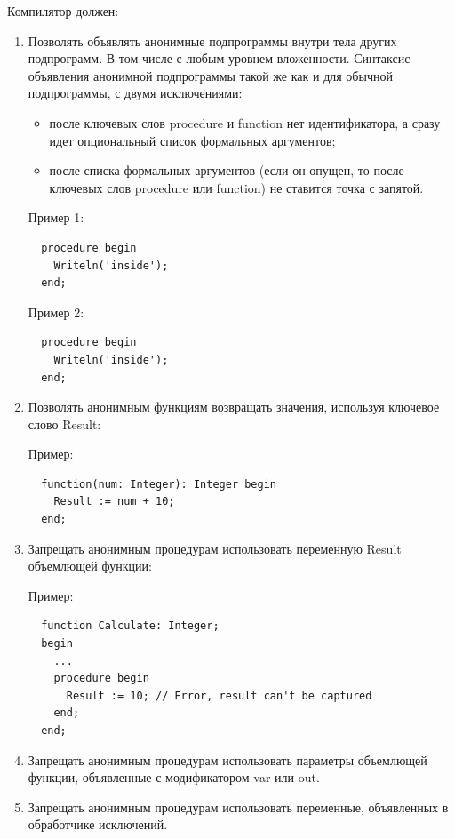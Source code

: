 \documentclass{imcs}
\begin{document}
Компилятор должен:
\begin{enumerate}
    \item Позволять объявлять анонимные подпрограммы внутри тела других подпрограмм. В том числе с любым уровнем
вложенности. Синтаксис объявления анонимной подпрограммы такой же как и для обычной подпрограммы, с двумя
исключениями:
        \begin{itemize}
            \item после ключевых слов procedure и function нет идентификатора, а сразу идет опциональный список формальных аргументов;
            \item после списка формальных аргументов (если он опущен, то после ключевых слов procedure или function) не ставится точка с запятой.
        \end{itemize}

         Пример 1:
\begin{lstlisting}
  procedure begin
    Writeln('inside');
  end;
\end{lstlisting}

         Пример 2:
\begin{lstlisting}
  procedure begin
    Writeln('inside');
  end;
\end{lstlisting}

    \item Позволять анонимным функциям возвращать значения, используя ключевое слово Result:

Пример:
\begin{lstlisting}
  function(num: Integer): Integer begin
    Result := num + 10;
  end;
\end{lstlisting}

    \item Запрещать анонимным процедурам использовать переменную Result объемлющей функции:

Пример:
\begin{lstlisting}
  function Calculate: Integer;
  begin
    ...
    procedure begin
      Result := 10; // Error, result can't be captured
    end;
  end;
\end{lstlisting}

    \item Запрещать анонимным процедурам использовать параметры объемлющей функции, объявленные с модификатором
var или out.

    \item Запрещать анонимным процедурам использовать переменные, объявленных в обработчике исключений.


\end{enumerate}
\end{document}
